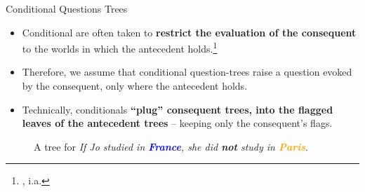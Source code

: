 \documentclass[10pt]{beamer}
\newcommand{\stronger}[1]{\textbf{\textcolor{orange}{#1}}}
\newcommand{\weaker}[1]{\textbf{\textcolor{blue}{#1}}}
\newcommand{\Paris}{\textbf{\textcolor{orange}{Paris}}}
\newcommand{\France}{\textbf{\textcolor{blue}{France}}}
\let\oldcaption=\caption
\renewcommand{\caption}[1][]{\oldcaption{\centering #1}}
\newcommand{\footciteia}[1]{\footnote{\cite{#1}, i.a.}}
\begin{document}
\begin{frame}{Conditional Questions Trees}
	\begin{minipage}{.55\linewidth}
		\begin{itemize}
			\item Conditional are often taken to \textbf{restrict the evaluation of the consequent} to the worlds in which the antecedent holds.\footciteia{Lewis1975,Heim1982,Kratzer1986,Kratzer1991}\pause
			\item Therefore, we assume that conditional question-trees raise a question evoked by the consequent, only where the antecedent holds.\pause
			\item Technically, conditionals \textbf{``plug'' consequent trees, into the flagged leaves of the antecedent trees} -- keeping only the consequent's flags.
		\end{itemize}
	\end{minipage}\hfill
	\begin{minipage}{.4\linewidth}
		\centering
		\begin{figure}[H]
			\centering
			\begin{minipage}{\linewidth}
				\centering
				\scalebox{.8}{
					\begin{forest}
						[CS[\xcancel{\faFlagCheckered}\\\France][\weaker{Italy}][\weaker{...}]]
				\end{forest}}
			\end{minipage}
			\begin{minipage}{\linewidth}
				\centering
				\scalebox{.8}{
				\begin{forest}
					[{CS$\cap$\France}[{\stronger{Paris}}][{\faFlagCheckered\\\stronger{Lyon}}][{\faFlagCheckered\\\stronger{...}}]]
					\draw[->] (0, .5) to[out=north, in=south] (-1, 1.2);
			\end{forest}}
		\end{minipage}\vspace{-3mm}
			\caption{A tree for \textit{If Jo studied in \France, she did \textbf{not} study in \Paris}.}
		\end{figure}
	\end{minipage}
\end{frame}
\end{document}
